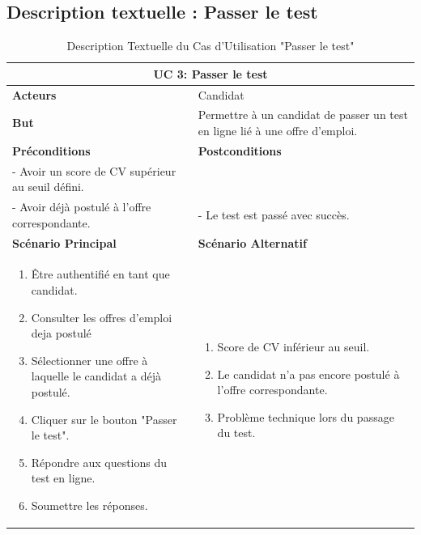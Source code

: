 \subsection{Description textuelle : Passer le test}
\begin{minipage}{\textwidth}
    \begin{table}[H]
    \centering
    \caption{Description Textuelle du Cas d'Utilisation "Passer le test"}
    \begin{tabular}{| m{8cm} | m{8cm} |}
    \hline
    \multicolumn{2}{|c|}{\textbf{UC 3:} Passer le test} \\ \hline
    \textbf{Acteurs} & Candidat \\ \hline
    \textbf{But} & Permettre à un candidat de passer un test en ligne lié à une offre d'emploi. \\ \hline
    \textbf{Préconditions} & \textbf{Postconditions} \\ \hline
    - Avoir un score de CV supérieur au seuil défini.\\
    - Avoir déjà postulé à l'offre correspondante. & - Le test est passé avec succès. \\ \hline
    \textbf{Scénario Principal} & \textbf{Scénario Alternatif} \\ \hline
    \begin{enumerate}
        \item Être authentifié en tant que candidat.
        \item Consulter les offres d'emploi deja postulé
        \item Sélectionner une offre à laquelle le candidat a déjà postulé.
        \item Cliquer sur le bouton "Passer le test".
        \item Répondre aux questions du test en ligne.
        \item Soumettre les réponses.
    \end{enumerate} & 
    \begin{enumerate}
        \item Score de CV inférieur au seuil.
        \item Le candidat n'a pas encore postulé à l'offre correspondante.
        \item Problème technique lors du passage du test.
    \end{enumerate} \\ \hline
    \end{tabular}
    \label{tab:UCPasser_Test}
    \end{table}
\end{minipage}


